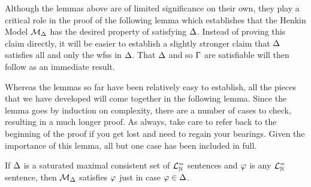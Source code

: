 Although the lemmas above are of limited significance on their own, they play a critical role in the proof of the following lemma which establishes that the Henkin Model $\mathcal{M}_{\Delta}$ has the desired property of satisfying $\Delta$. 
Instead of proving this claim directly, it will be easier to establish a slightly stronger claim that $\Delta$ satisfies all and only the wfss in $\Delta$. 
That $\Delta$ and so $\Gamma$ are satisfiable will then follow as an immediate result.

Whereas the lemmas so far have been relatively easy to establish, all the pieces that we have developed will come together in the following lemma.
Since the lemma goes by induction on complexity, there are a number of cases to check, resulting in a much longer proof.
As always, take care to refer back to the beginning of the proof if you get lost and need to regain your bearings.
Given the importance of this lemma, all but one case has been included in full.

\begin{Lthm} \label{lemma:truth}
  If $\Delta$ is a saturated maximal consistent set of $\mathcal{L}^{=}_{\mathbb{N}}$ sentences and $\varphi$ is any $\mathcal{L}^{=}_{\mathbb{N}}$ sentence, then $\mathcal{M}_{\Delta}$ satisfies $\varphi$ just in case $\varphi\in\Delta$.  
\end{Lthm}

